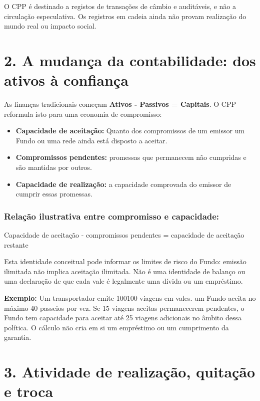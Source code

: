 \documentclass[11pt]{article}
\begin{document}
O CPP é destinado a registos de transações de câmbio e auditáveis, e não a circulação especulativa. Os registros em cadeia ainda não provam realização do mundo real ou impacto social.


\section*{2. A mudança da contabilidade: dos ativos à confiança}

As finanças tradicionais começam \textbf{Ativos - Passivos = Capitais}. O CPP reformula isto para uma economia de compromisso:

\begin{itemize}[leftmargin=*]
\item \textbf{Capacidade de aceitação:} Quanto dos compromissos de um emissor um Fundo ou uma rede ainda está disposto a aceitar.
\item \textbf{Compromissos pendentes:} promessas que permanecem não cumpridas e são mantidas por outros.
\item \textbf{Capacidade de realização:} a capacidade comprovada do emissor de cumprir essas promessas.
\end{itemize}
\subsubsection*{Relação ilustrativa entre compromisso e capacidade:}

Capacidade de aceitação - compromissos pendentes = capacidade de aceitação restante

Esta identidade conceitual pode informar os limites de risco do Fundo: emissão ilimitada não implica aceitação ilimitada. Não é uma identidade de balanço ou uma declaração de que cada vale é legalmente uma dívida ou um empréstimo.

\textbf{Exemplo:} Um transportador emite 100100 viagens em vales. um Fundo aceita no máximo 40 passeios por vez. Se 15 viagens aceitas permanecerem pendentes, o Fundo tem capacidade para aceitar até 25 viagens adicionais no âmbito dessa política. O cálculo não cria em si um empréstimo ou um cumprimento da garantia.



\section*{3. Atividade de realização, quitação e troca}
\end{document}
